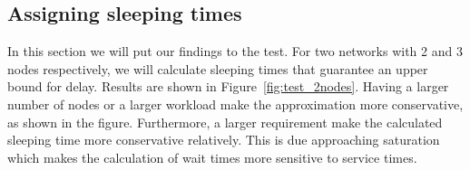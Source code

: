 \subsection{Assigning sleeping times}
In this section we will put our findings to the test. For two networks with 2 and 3 nodes respectively, we will calculate sleeping times that guarantee an upper bound for delay. Results are shown in Figure~\ref{fig:test_2nodes}. Having a larger number of nodes or a larger workload make the approximation more conservative, as shown in the figure. Furthermore, a larger requirement make the calculated sleeping time more conservative relatively. This is due approaching saturation which makes the calculation of wait times more sensitive to service times.




